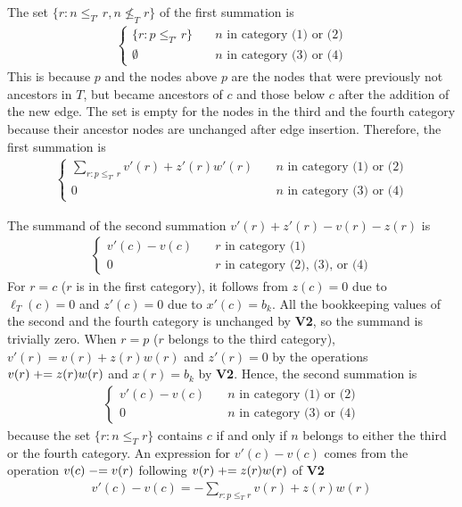 The set $\{r: n \le_{T'} r, n \nleq_T r\}$ of the first summation is
\begin{align}
    \begin{cases}
         \{r: p \le_{T'} r\} & \quad \text{$n$ in category (1) or (2)} \\
        \emptyset & \quad \text{$n$ in category (3) or (4)}
    \end{cases}
\end{align}
This is because $p$ and the nodes above $p$ are the nodes that were previously not ancestors in $T$, but became ancestors of $c$ and those below $c$ after the addition of the new edge.
The set is empty for the nodes in the third and the fourth category because their ancestor nodes are unchanged after edge insertion.
Therefore, the first summation is
\begin{align}
    \begin{cases}
        \sum_{r: p \le_{T'} r} v'(r) + z'(r)w'(r) & \quad \text{$n$ in category (1) or (2)} \\
        0 & \quad \text{$n$ in category (3) or (4)}
    \end{cases}
\end{align}

The summand of the second summation $v'(r) + z'(r) - v(r) - z(r)$ is
\begin{align}
    \begin{cases}
    v'(c) - v(c) & \quad \text{$r$ in category (1)} \\
    0 & \quad  \text{$r$ in category (2), (3), or (4)}
    \end{cases} 
\end{align}
For $r=c$ ($r$ is in the first category), it follows from $z(c)=0$ due to $\ell_T(c)=0$ and $z'(c)=0$ due to $x'(c)=b_k$.
All the bookkeeping values of the second and the fourth category is unchanged by \textbf{V2}, so the summand is trivially zero.
When $r=p$ ($r$ belongs to the third category), $v'(r) = v(r) + z(r)w(r)$  and $z'(r)=0$ by the operations $v(r) \mathrel{+}= z(r)w(r)$ and $x(r)=b_k$ by \textbf{V2}.
Hence, the second summation is
\begin{align}
    \begin{cases}
        v'(c) - v(c) & \quad \text{$n$ in category (1) or (2)} \\
        0 & \quad \text{$n$ in category (3) or (4)}
    \end{cases}
\end{align}
because the set $\{r: n \le_T r\}$ contains $c$ if and only if $n$ belongs to either the third or the fourth category.
An expression for $v'(c)-v(c)$ comes from the operation $v(c) \mathrel{-}= v(r)$ following $v(r) \mathrel{+}= z(r)w(r)$ of \textbf{V2}
\begin{align}
    v'(c) - v(c) = - \sum_{r: p \le_{T} r} v(r) + z(r)w(r)
\end{align}

